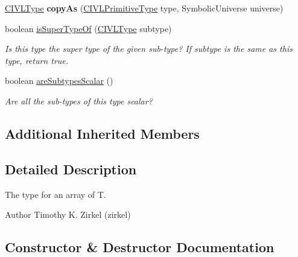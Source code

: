 \begin{DoxyCompactItemize}
\item 
\hypertarget{classedu_1_1udel_1_1cis_1_1vsl_1_1civl_1_1model_1_1common_1_1type_1_1CommonArrayType_a4b7b4f770f7399e4d6613fb8f670b972}{}\hyperlink{interfaceedu_1_1udel_1_1cis_1_1vsl_1_1civl_1_1model_1_1IF_1_1type_1_1CIVLType}{C\+I\+V\+L\+Type} {\bfseries copy\+As} (\hyperlink{interfaceedu_1_1udel_1_1cis_1_1vsl_1_1civl_1_1model_1_1IF_1_1type_1_1CIVLPrimitiveType}{C\+I\+V\+L\+Primitive\+Type} type, Symbolic\+Universe universe)\label{classedu_1_1udel_1_1cis_1_1vsl_1_1civl_1_1model_1_1common_1_1type_1_1CommonArrayType_a4b7b4f770f7399e4d6613fb8f670b972}

\item 
boolean \hyperlink{classedu_1_1udel_1_1cis_1_1vsl_1_1civl_1_1model_1_1common_1_1type_1_1CommonArrayType_a6a2239188736a79f06b59ef20bb8b421}{is\+Super\+Type\+Of} (\hyperlink{interfaceedu_1_1udel_1_1cis_1_1vsl_1_1civl_1_1model_1_1IF_1_1type_1_1CIVLType}{C\+I\+V\+L\+Type} subtype)
\begin{DoxyCompactList}\small\item\em Is this type the super type of the given sub-\/type? If subtype is the same as this type, return true. \end{DoxyCompactList}\item 
boolean \hyperlink{classedu_1_1udel_1_1cis_1_1vsl_1_1civl_1_1model_1_1common_1_1type_1_1CommonArrayType_a0e4c5c4eb12400e6971da567858d4276}{are\+Subtypes\+Scalar} ()
\begin{DoxyCompactList}\small\item\em Are all the sub-\/types of this type scalar? \end{DoxyCompactList}\end{DoxyCompactItemize}
\subsection*{Additional Inherited Members}


\subsection{Detailed Description}
The type for an array of T. 

\begin{DoxyAuthor}{Author}
Timothy K. Zirkel (zirkel) 
\end{DoxyAuthor}


\subsection{Constructor \& Destructor Documentation}
\hypertarget{classedu_1_1udel_1_1cis_1_1vsl_1_1civl_1_1model_1_1common_1_1type_1_1CommonArrayType_a38fc03a53c717b650cc5376cd2b219b0}{}

